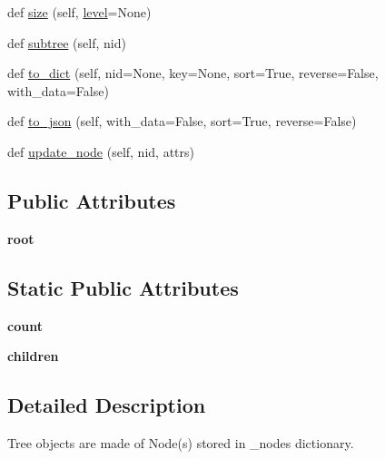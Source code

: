 \begin{DoxyCompactItemize}
\item 
def \mbox{\hyperlink{classtreelib_1_1tree_1_1Tree_aae6f22415766812580d66979c19966e0}{size}} (self, \mbox{\hyperlink{classtreelib_1_1tree_1_1Tree_a4c1fa1eb04b6c8b4613a34425207c07e}{level}}=None)
\item 
def \mbox{\hyperlink{classtreelib_1_1tree_1_1Tree_ad460737959269e893cd982c5b671da8e}{subtree}} (self, nid)
\item 
def \mbox{\hyperlink{classtreelib_1_1tree_1_1Tree_ae50b498b092788a6e7e365cca925d4b8}{to\+\_\+dict}} (self, nid=None, key=None, sort=True, reverse=False, with\+\_\+data=False)
\item 
def \mbox{\hyperlink{classtreelib_1_1tree_1_1Tree_aa39a6f2ad477fc42c7f5339f7b67527e}{to\+\_\+json}} (self, with\+\_\+data=False, sort=True, reverse=False)
\item 
def \mbox{\hyperlink{classtreelib_1_1tree_1_1Tree_a502b9221b106f3bda9ddc9506af40511}{update\+\_\+node}} (self, nid, attrs)
\end{DoxyCompactItemize}
\subsection*{Public Attributes}
\begin{DoxyCompactItemize}
\item 
\mbox{\label{classtreelib_1_1tree_1_1Tree_af30e59fe700908a4fa0d22a878cdb3d5}} 
{\bfseries root}
\end{DoxyCompactItemize}
\subsection*{Static Public Attributes}
\begin{DoxyCompactItemize}
\item 
\mbox{\label{classtreelib_1_1tree_1_1Tree_a0dc2f30f27c749ad748ced1eee1d95a0}} 
{\bfseries count}
\item 
\mbox{\label{classtreelib_1_1tree_1_1Tree_a6498a524482b7197ef8e7c7a69ea7018}} 
{\bfseries children}
\end{DoxyCompactItemize}


\subsection{Detailed Description}
\begin{DoxyVerb}Tree objects are made of Node(s) stored in _nodes dictionary.\end{DoxyVerb}
 


